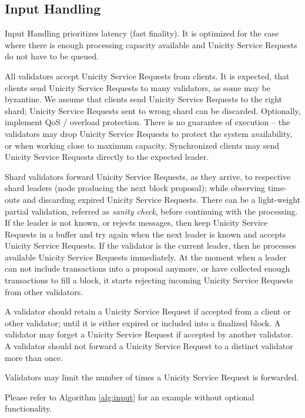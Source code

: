 \subsection{Input Handling}\label{input-handling}

Input Handling prioritizes latency (fast finality). It is optimized for the case where there is enough processing capacity available and Unicity Service Requests do not have to be queued.

All validators accept Unicity Service Requests from clients. It is expected, that clients send Unicity Service Requests to many validators, as some may be byzantine. We assume that clients send Unicity Service Requests to the right shard; Unicity Service Requests sent to wrong shard can be discarded. Optionally, implement QoS / overload protection. There is no guarantee of execution -- the validators may drop Unicity Service Requests to protect the system availability, or when working close to maximum capacity. Synchronized clients may send Unicity Service Requests directly to the expected leader.

Shard validators forward Unicity Service Requests, as they arrive, to respective shard leaders (node producing the next block proposal); while observing time-outs and discarding expired Unicity Service Requests. There can be a light-weight partial validation, referred as \textit{sanity check}, before continuing with the processing. If the leader is not known, or rejects messages, then keep Unicity Service Requests in a buffer and try again when the next leader is known and accepts Unicity Service Requests. If the validator is the current leader, then he processes available Unicity Service Requests immediately. At the moment when a leader can not include transactions into a proposal anymore, or have collected enough transactions to fill a block, it starts rejecting incoming Unicity Service Requests from other validators.

A validator should retain a Unicity Service Request if accepted from a client or other validator; until it is either expired or included into a finalized block. A validator may forget a Unicity Service Request if accepted by another validator. A validator should not forward a Unicity Service Request to a distinct validator more than once.

Validators may limit the number of times a Unicity Service Request is forwarded.

Please refer to Algorithm \ref{alg:input} for an example without optional functionality.

